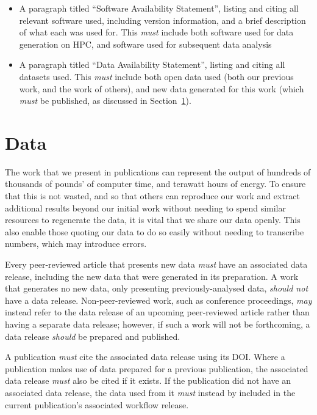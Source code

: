 \documentclass{article}
\newcommand\rfcword[1]{\emph{#1}\xspace}
\newcommand\must{\rfcword{must}}
\newcommand\should{\rfcword{should}}
\newcommand\shouldnot{\rfcword{should not}}
\newcommand\may{\rfcword{may}}
\begin{document}
\begin{itemize}
  \item
        A paragraph titled ``Software Availability Statement'',
        listing and citing all relevant software used,
        including version information,
        and a brief description of what each was used for.
        This \must include both software used for data generation on HPC,
        and software used for subsequent data analysis
  \item
        A paragraph titled ``Data Availability Statement'',
        listing and citing all datasets used.
        This \must include both open data used
        (both our previous work,
        and the work of others),
        and new data generated for this work
        (which \must be published,
        as discussed in Section~\ref{sec:data}).
\end{itemize}

\section{Data}\label{sec:data}

The work that we present in publications can represent
the output of hundreds of thousands of pounds' of computer time,
and terawatt hours of energy.
To ensure that this is not wasted,
and so that others can reproduce our work
and extract additional results beyond our initial work
without needing to spend similar resources to regenerate the data,
it is vital that we share our data openly.
This also enable those quoting our data to do so easily
without needing to transcribe numbers,
which may introduce errors.

Every peer-reviewed article that presents new data
\must have an associated data release,
including the new data that were generated in its preparation.
A work that generates no new data,
only presenting previously-analysed data,
\shouldnot have a data release.
Non-peer-reviewed work,
such as conference proceedings,
\may instead refer to
the data release of an upcoming peer-reviewed article
rather than having a separate data release;
however,
if such a work will not be forthcoming,
a data release \should be prepared and published.

A publication \must cite the associated data release using its DOI\@.
Where a publication makes use of data prepared for a previous publication,
the associated data release \must also be cited if it exists.
If the publication did not have an associated data release,
the data used from it \must instead by included in
the current publication's associated workflow release.
\end{document}
